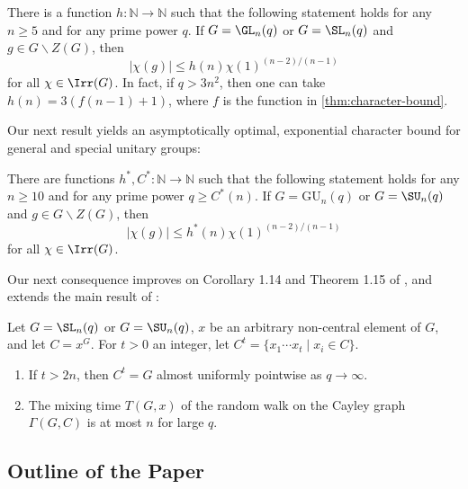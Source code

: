 \documentclass[eqthmnum,nocolour,skinny]{jt-calcs}
\newcommand{\GU}{\ensuremath{\mathrm{GU}}}
\begin{document}
\begin{thm}\label{thm:glsl}
There is a function $h: \mathbb{N} \to \mathbb{N}$ such that the following statement holds for any $n \geq 5$ and for any prime power $q$. If $G = \GL_n(q)$ or $G=\SL_n(q)$ and $g \in G \smallsetminus Z(G)$, then
\begin{equation*} 
|\chi(g)| \leq h(n)\chi(1)^{(n-2)/(n-1)}
\end{equation*}
for all $\chi \in \Irr(G)$. In fact, if $q > 3n^2$, then one can take $h(n) = 3(f(n-1)+1)$, where $f$ is the function in \cref{thm:character-bound}.
\end{thm}

Our next result yields an asymptotically optimal, exponential character bound for general and special unitary groups:

\begin{thm}\label{thm:gusu}
There are functions $h^*,C^*: \mathbb{N} \to \mathbb{N}$ such that the following statement holds for any $n \geq 10$ and for any prime power $q \geq C^*(n)$.
If $G = \GU_n(q)$ or $G = \SU_n(q)$ and $g \in G \smallsetminus Z(G)$, then
\begin{equation*}
|\chi(g)| \leq h^*(n)\chi(1)^{(n-2)/(n-1)}
\end{equation*}
for all $\chi \in \Irr(G)$. 
\end{thm}

Our next consequence improves on Corollary 1.14 and Theorem 1.15 of \cite{bezrukavnikov-liebeck-shalev-tiep:2017:character-bounds-grps-Lie-type}, 
and extends the main result of \cite{Hil}:
 
\begin{cor}\label{cor:slsu} Let $G= \SL_n(q)$ or $G = \SU_n(q)$,  $x$ be an arbitrary non-central element of $G$, and let $C = x^G$. For $t > 0$ an integer, let $C^t = \{x_1\cdots x_t \mid x_i \in C\}$.
\begin{enumerate}[label={\normalfont (\roman*)}]
	\item If $t>2n$, then $C^t = G$ almost uniformly pointwise as $q\rightarrow \infty$.
	\item The mixing time $T(G,x)$ of the random walk on the Cayley graph $\Gamma(G,C)$ is at most $n$ for large $q$.
\end{enumerate}
\end{cor}

\subsection*{Outline of the Paper}
\end{document}

